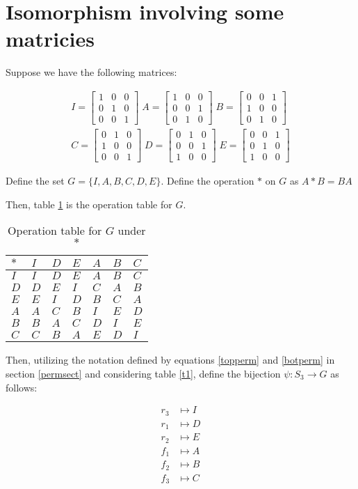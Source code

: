 \documentclass[12pt]{article}
\newcommand{\glxmatrix}[9]{\ensuremath{\begin{bmatrix} #1 & #2 & #3 \\
#4 & #5 & #6 \\ #7 & #8 & #9 \end{bmatrix}}}
\begin{document}
\section{Isomorphism involving some matricies}

Suppose we have the following matrices:

\begin{align}
	I = \glxmatrix{1}{0}{0}{0}{1}{0}{0}{0}{1} \;
	A = \glxmatrix{1}{0}{0}{0}{0}{1}{0}{1}{0} \;
	B = \glxmatrix{0}{0}{1}{1}{0}{0}{0}{1}{0} \\
	C = \glxmatrix{0}{1}{0}{1}{0}{0}{0}{0}{1} \;
	D = \glxmatrix{0}{1}{0}{0}{0}{1}{1}{0}{0} \;
	E = \glxmatrix{0}{0}{1}{0}{1}{0}{1}{0}{0} 
\end{align}

Define the set $G = \{ I, A, B, C, D, E \}$.
Define the operation $*$ on $G$ as $A * B = BA$

Then, table \ref{t3} is the operation table for $G$.

\begin{table}[!ht] 
\begin{tabular}{l|llllll}
	$*$ & $I$ & $D$ & $E$ & $A$ & $B$ & $C$	\\ \hline
	$I$ & $I$ & $D$ & $E$ & $A$ & $B$ & $C$ \\
	$D$ & $D$ & $E$ & $I$ & $C$ & $A$ & $B$ \\
	$E$ & $E$ & $I$ & $D$ & $B$ & $C$ & $A$ \\
	$A$ & $A$ & $C$ & $B$ & $I$ & $E$ & $D$ \\
	$B$ & $B$ & $A$ & $C$ & $D$ & $I$ & $E$ \\
	$C$ & $C$ & $B$ & $A$ & $E$ & $D$ & $I$	\\
\end{tabular}
\centering
\caption{Operation table for $G$ under $*$}
\label{t3}
\end{table}

Then, utilizing the notation defined by equations \ref{topperm} and \ref{botperm}
in section \ref{permsect} and considering table \ref{t1},
define the bijection $\psi:S_3 \to G$ as follows:

\begin{align*}
	r_3 & \mapsto I \\
	r_1 & \mapsto D \\
	r_2 & \mapsto E \\
	f_1 & \mapsto A \\
	f_2 & \mapsto B \\
	f_3 & \mapsto C
\end{align*}
\end{document}
